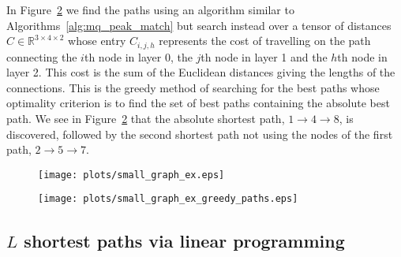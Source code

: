 \documentclass{article}
\newcommand{\TmpCapTitle}[0]{default}
\newcommand{\CaptionWithTitle}[2]{
    \renewcommand{\TmpCapTitle}[0]{\protect#1}
    \captionsetup{format=inc-cap-title}
    \caption[\protect#1.]{#2}
}
\def\figwidthscale{0.5}
\begin{document}
\begin{sloppy}
In Figure~\ref{plot:simple_graph_greedy_paths} we find the paths using an
algorithm similar to Algorithms~\ref{alg:mq_peak_match} but search instead over a
tensor of distances $C \in \mathbb{R}^{3 \times 4 \times 2}$ whose entry
$C_{i,j,h}$ represents the cost of travelling on the path connecting the $i$th
node in layer 0, the $j$th node in layer 1 and the $h$th node in layer 2. This
cost is the sum of the Euclidean distances giving the lengths of the
connections. This is the greedy method of searching for the best paths whose
optimality criterion is to find the set of best paths containing the absolute
best path. We see in Figure~\ref{plot:simple_graph_greedy_paths} that the
absolute shortest path, $1 \rightarrow 4 \rightarrow 8$, is discovered, followed
by the second shortest path not using the nodes of the first path, $2
\rightarrow 5 \rightarrow 7$.

\begin{figure}[!t]
    \centering
    \centerline{\texttt{[image: plots/small\_graph\_ex.eps]}}
    \CaptionWithTitle{%
    }{\label{plot:simple_graph}}
\end{figure}

\begin{figure}[!t]
    \centering
    \centerline{\texttt{[image: plots/small\_graph\_ex\_greedy\_paths.eps]}}
    \CaptionWithTitle{%
    }{\label{plot:simple_graph_greedy_paths}}
\end{figure}

\subsection{$L$ shortest paths via linear programming}


\end{sloppy}
\end{document}
